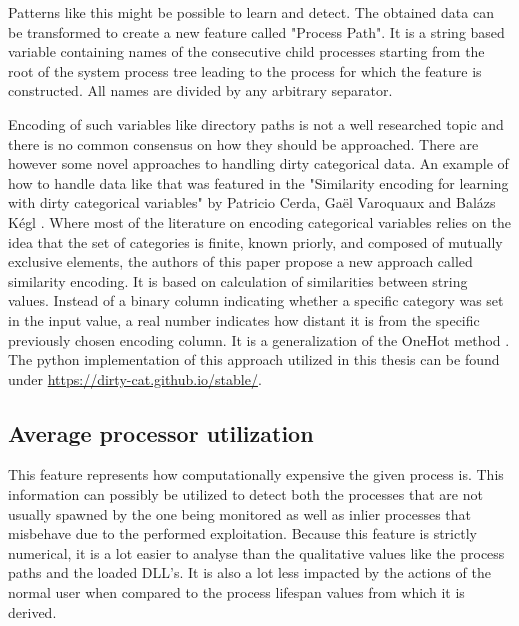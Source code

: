 \documentclass[a4paper,twoside,12pt]{book}
\begin{document}
Patterns like this might be possible to learn and detect. The obtained data can be transformed
to create a new feature called "Process Path". It is a string based variable containing names 
of the consecutive child processes starting from the root of the system process tree leading to the 
process for which the feature is constructed. All names are divided by any arbitrary separator. 

Encoding of such variables like directory paths is not a well researched topic and there is no 
common consensus on how they should be approached. There are however some novel approaches to 
handling dirty categorical data. An example of how to handle data like that was featured in the 
"Similarity encoding for learning with dirty categorical variables" by Patricio Cerda,  Ga{\"e}l 
Varoquaux and Bal{\'a}zs K{\'e}gl \cite{bib:dirtycat}. Where most of the literature on encoding categorical variables 
relies on the idea that the set of categories is finite, known priorly, and composed of mutually 
exclusive elements, the authors of this paper propose a new approach called similarity encoding. 
It is based on calculation of similarities between string values. Instead of a binary column 
indicating whether a specific category was set in the input value, a real number indicates how 
distant it is from the specific previously chosen encoding column. It is a generalization of the 
OneHot method \cite{bib:dirtycat}. The python implementation of this approach utilized in this thesis 
can be found under \url{https://dirty-cat.github.io/stable/}.

\subsection{Average processor utilization}

This feature represents how computationally expensive the given process is. This information can possibly 
be utilized to detect both the processes that are not usually spawned by the one being monitored as well as
inlier processes that misbehave due to the performed exploitation. Because this feature is 
strictly numerical, it is a lot easier to analyse than the qualitative values like the process
paths and the loaded DLL's. It is also a lot less impacted by the actions of the normal user when
compared to the process lifespan values from which it is derived.

\end{document}
